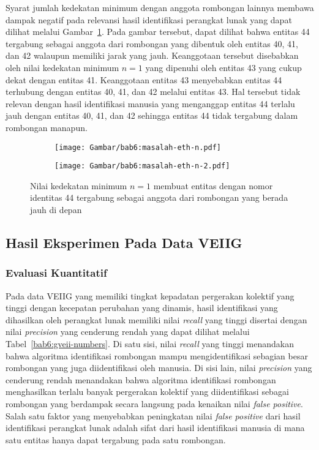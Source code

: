 Syarat jumlah kedekatan minimum dengan anggota rombongan lainnya membawa dampak negatif pada relevansi hasil identifikasi perangkat lunak yang dapat dilihat melalui Gambar~\ref{bab6:masalah-eth-n}. Pada gambar tersebut, dapat dilihat bahwa entitas 44 tergabung sebagai anggota dari rombongan yang dibentuk oleh entitas 40, 41, dan 42 walaupun memiliki jarak yang jauh. Keanggotaan tersebut disebabkan oleh nilai kedekatan minimum $n = 1$ yang dipenuhi oleh entitas 43 yang cukup dekat dengan entitas 41. Keanggotaan entitas 43 menyebabkan entitas 44 terhubung dengan entitas 40, 41, dan 42 melalui entitas 43. Hal tersebut tidak relevan dengan hasil identifikasi manusia yang menganggap entitas 44 terlalu jauh dengan entitas 40, 41, dan 42 sehingga entitas 44 tidak tergabung dalam rombongan manapun.

\begin{figure}[h]
    \centering
    \captionsetup{width=.6\textwidth}
    \begin{subfigure}[h]{0.2\textwidth}
        \centering
        \texttt{[image: Gambar/bab6:masalah-eth-n.pdf]}
    \end{subfigure}
    \begin{subfigure}[h]{0.2\textwidth}
        \centering
        \texttt{[image: Gambar/bab6:masalah-eth-n-2.pdf]}
    \end{subfigure}
    \caption[Masalah nilai $n$ pada data BIWI ETH]{Nilai kedekatan minimum $n = 1$ membuat entitas dengan nomor identitas 44 tergabung sebagai anggota dari rombongan yang berada jauh di depan}
    \label{bab6:masalah-eth-n}
\end{figure}

\subsection{Hasil Eksperimen Pada Data VEIIG}
\label{subsec:veiig-result}

\subsubsection{Evaluasi Kuantitatif}
\label{subsubsec:veiig-quantitative}

Pada data VEIIG yang memiliki tingkat kepadatan pergerakan kolektif yang tinggi dengan kecepatan perubahan yang dinamis, hasil identifikasi yang dihasilkan oleh perangkat lunak memiliki nilai \textit{recall} yang tinggi disertai dengan nilai \textit{precision} yang cenderung rendah yang dapat dilihat melalui Tabel~\ref{bab6:gveii-numbers}. Di satu sisi, nilai \textit{recall} yang tinggi menandakan bahwa algoritma identifikasi rombongan mampu mengidentifikasi sebagian besar rombongan yang juga diidentifikasi oleh manusia. Di sisi lain, nilai \textit{precision} yang cenderung rendah menandakan bahwa algoritma identifikasi rombongan menghasilkan terlalu banyak pergerakan kolektif yang diidentifikasi sebagai rombongan yang berdampak secara langsung pada kenaikan nilai \textit{false positive}. Salah satu faktor yang menyebabkan peningkatan nilai \textit{false positive} dari hasil identifikasi perangkat lunak adalah sifat dari hasil identifikasi manusia di mana satu entitas hanya dapat tergabung pada satu rombongan.

